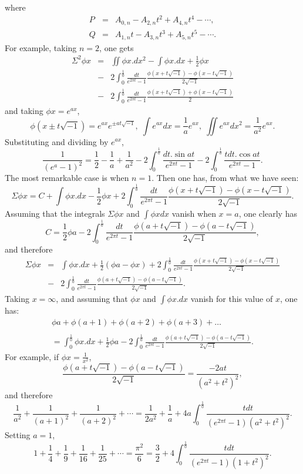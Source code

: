 \documentclass[12pt]{article}
\begin{document}
 where 
 \begin{eqnarray*} P &=& A_{0,n} - A_{2,n}t^2 + A_{4,n}t^4 - \cdots, \\
 Q &=& A_{1,n} t - A_{3,n}t^3 + A_{5,n}t^5 - \cdots  .\end{eqnarray*}
 For example, taking $n=2$, one gets
 \begin{eqnarray*} \Sigma^2\phi x &=& \iint \phi x.dx^2 - \int \phi x .dx + \frac{1}{2} \phi x  \\
 & - & 2 \int_0^{\frac{1}{0}} \frac{dt}{e^{2\pi t}-1} \frac{\phi(x+t \sqrt{-1}) - \phi(x - t \sqrt{-1})}{2\sqrt{-1}} \\
 & - & 2 \int_0^{\frac{1}{0}} \frac{dt}{e^{2\pi t}-1} \frac{\phi(x+t \sqrt{-1}) + \phi(x - t \sqrt{-1})}{2} \end{eqnarray*}  
 and taking $\phi x = e^{ax}$,
 \[ \phi(x \pm t\sqrt{-1}) = e^{ax}e^{\pm at\sqrt{-1}}, \; \int e^{ax}dx = \frac{1}{a}e^{ax}, \; \iint e^{ax}dx^2 = \frac{1}{a^2}e^{ax}. \]
 Substituting and dividing by $e^{ax}$,
\[ \frac{1}{\left(e^a - 1\right)^2} = \frac{1}{2} - \frac{1}{a} + \frac{1}{a^2} - 2 \int_0^{\frac{1}{0}} \frac{dt.\sin at}{e^{2\pi t} -1} - 2 \int_0^{\frac{1}{0}} \frac{tdt.\cos at}{e^{2\pi t}-1} . \]
The most remarkable case is when $n=1$.  Then one has, from what we have seen:
\[ \Sigma \phi x = C + \int \phi x.dx - \frac{1}{2} \phi x+ 2 \int_0^{\frac{1}{0}}\frac{dt}{e^{2 \pi t} -1} \frac{\phi(x+t \sqrt{-1}) - \phi(x - t \sqrt{-1})}{2\sqrt{-1}} . \]
Assuming that the integrals $\Sigma \phi x$ and $\int \phi x dx$ vanish when $x = a$, one clearly has 
\[ C = \frac{1}{2} \phi a - 2 \int_0^{\frac{1}{0}} \frac{dt}{e^{2\pi t} -1} \frac{\phi(a+t \sqrt{-1}) - \phi(a - t \sqrt{-1})}{2\sqrt{-1}}, \]
and therefore
\begin{eqnarray*} \Sigma \phi x &=&  \int \phi x.dx + \frac{1}{2} \left( \phi a-  \phi x \right) + 2 \int_0^{\frac{1}{0}}\frac{dt}{e^{2 \pi t} -1} \frac{\phi(x+t \sqrt{-1}) - \phi(x - t \sqrt{-1})}{2\sqrt{-1}} \\&-& 2 \int_0^{\frac{1}{0}} \frac{dt}{e^{2\pi t} -1} \frac{\phi(a+t \sqrt{-1}) - \phi(a - t \sqrt{-1})}{2\sqrt{-1}}. \end{eqnarray*}
Taking $x = \infty$, and assuming that $\phi x$ and $\int \phi x .dx$ vanish for this value of $x$, one has:
\[ \begin{array}{l} \phi a + \phi(a+1) + \phi(a+2) + \phi(a+3) + \dots \\ \\
   = \displaystyle \int_0^{\frac{1}{0}} \phi x. dx + \frac{1}{2} \phi a - 2 \int_0^{\frac{1}{0}} \frac{dt}{e^{2\pi t}-1} \frac{\phi(a+t \sqrt{-1}) - \phi(a - t \sqrt{-1})}{2\sqrt{-1}} . \end{array} \] 
For example, if $\phi x = \frac{1}{x^2}$, 
\[ \frac{\phi(a+t \sqrt{-1}) - \phi(a - t \sqrt{-1})}{2\sqrt{-1}} = \frac{-2at}{\left(a^2 + t^2\right)^2} , \]
and therefore 
\[ \frac{1}{a^2} + \frac{1}{\left(a+1\right)^2} + \frac{1}{\left(a+2\right)^2} + \cdots = \frac{1}{2a^2} + \frac{1}{a} + 4a \int_0^{\frac{1}{0}} \frac{t dt}{(e^{2\pi t} - 1)(a^2 + t^2)^2} . \]
Setting $a = 1$,
\[ 1 + \frac{1}{4} + \frac{1}{9} + \frac{1}{16} + \frac{1}{25} + \cdots = \frac{\pi^2}{6} = \frac{3}{2} + 4 \int_0^{\frac{1}{0}}  \frac{t dt}{(e^{2\pi t}-1)(1+ t^2)^2 } . \]
  
\end{document}
